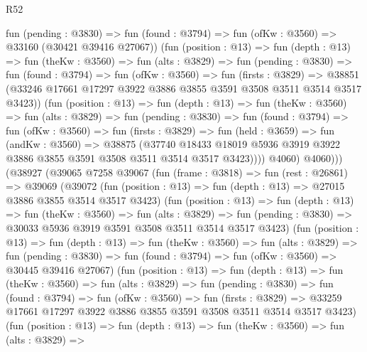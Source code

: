 \begin{lexlean}{R52}
\begin{coremodule}
                fun (pending : @3830) =>
                fun (found : @3794) => fun (ofKw : @3560) => @33160 (@30421 @39416 @27067))
                (fun (position : @13) =>
                fun (depth : @13) =>
                fun (theKw : @3560) =>
                fun (alts : @3829) =>
                fun (pending : @3830) =>
                fun (found : @3794) =>
                fun (ofKw : @3560) =>
                fun (firsts : @3829) =>
                @38851 (@33246 @17661 @17297 @3922 @3886 @3855 @3591 @3508 @3511 @3514 @3517 @3423))
                (fun (position : @13) =>
                fun (depth : @13) =>
                fun (theKw : @3560) =>
                fun (alts : @3829) =>
                fun (pending : @3830) =>
                fun (found : @3794) =>
                fun (ofKw : @3560) =>
                fun (firsts : @3829) =>
                fun (held : @3659) =>
                fun (andKw : @3560) =>
                @38875
                  (@37740
                    @18433
                    @18019
                    @5936
                    @3919
                    @3922
                    @3886
                    @3855
                    @3591
                    @3508
                    @3511
                    @3514
                    @3517
                    @3423))))
            @4060)
          @4060)))
    (@38927
      (@39065
        @7258
        @39067
        (fun (frame : @3818) =>
        fun (rest : @26861) =>
        @39069
          (@39072
            (fun (position : @13) => fun (depth : @13) => @27015 @3886 @3855 @3514 @3517 @3423)
            (fun (position : @13) =>
            fun (depth : @13) =>
            fun (theKw : @3560) =>
            fun (alts : @3829) =>
            fun (pending : @3830) => @30033 @5936 @3919 @3591 @3508 @3511 @3514 @3517 @3423)
            (fun (position : @13) =>
            fun (depth : @13) =>
            fun (theKw : @3560) =>
            fun (alts : @3829) =>
            fun (pending : @3830) =>
            fun (found : @3794) => fun (ofKw : @3560) => @30445 @39416 @27067)
            (fun (position : @13) =>
            fun (depth : @13) =>
            fun (theKw : @3560) =>
            fun (alts : @3829) =>
            fun (pending : @3830) =>
            fun (found : @3794) =>
            fun (ofKw : @3560) =>
            fun (firsts : @3829) =>
            @33259 @17661 @17297 @3922 @3886 @3855 @3591 @3508 @3511 @3514 @3517 @3423)
            (fun (position : @13) =>
            fun (depth : @13) =>
            fun (theKw : @3560) =>
            fun (alts : @3829) =>

\end{coremodule}
\end{lexlean}

